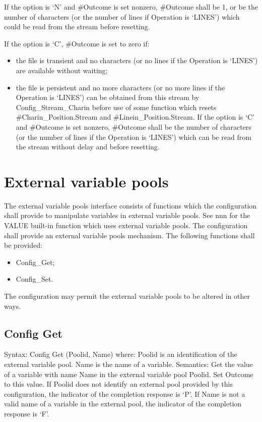 If the option is `N' and \#Outcome is set nonzero, \#Outcome shall be 1,
or be the number of characters (or the number of lines if Operation is
`LINES') which could be read from the stream before resetting.

If the option is `C', \#Outcome is set to zero if:

\begin{itemize}
\item
  the file is transient and no characters (or no lines if the Operation
  is `LINES') are available without waiting;
\item
  the file is persistent and no more characters (or no more lines if the
  Operation is `LINES') can be obtained from this stream by
  Config\_Stream\_Charin before use of some function which resets
  \#Charin\_Position.Stream and \#Linein\_Position.Stream. If the option
  is `C' and \#Outcome is set nonzero, \#Outcome shall be the number of
  characters (or the number of lines if the Operation is `LINES') which
  can be read from the stream without delay and before resetting.
\end{itemize}

\section{External variable pools}\label{external-variable-pools}

The external variable pools interface consists of functions which the
configuration shall provide to manipulate variables in external variable
pools. See nnn for the VALUE built-in function which uses external
variable pools. The configuration shall provide an external variable
pools mechanism. The following functions shall be provided:

\begin{itemize}
\item
  Config\_Get;
\item
  Config\_Set.
\end{itemize}

The configuration may permit the external variable pools to be altered
in other ways.

\subsection{Config Get}\label{config-get}

Syntax: Config Get (Poolid, Name) where: Poolid is an identification of
the external variable pool. Name is the name of a variable. Semantics:
Get the value of a variable with name Name in the external variable pool
Poolid. Set Outcome to this value. If Poolid does not identify an
external pool provided by this configuration, the indicator of the
completion response is `P'. If Name is not a valid name of a variable in
the external pool, the indicator of the completion response is `F'.


